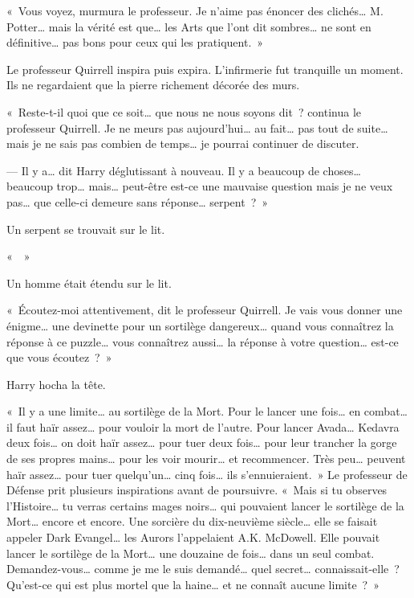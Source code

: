 {«~Vous voyez, murmura le professeur.
Je n'aime pas énoncer des clichés…
M. Potter… mais la vérité est que… les Arts que l'ont dit sombres… ne sont en définitive… pas bons pour ceux qui les pratiquent.~»

Le professeur Quirrell inspira puis expira.
L'infirmerie fut tranquille un moment.
Ils ne regardaient que la pierre richement décorée des murs.

«~Reste-t-il quoi que ce soit… que nous ne nous soyons dit~? continua le professeur Quirrell.
Je ne meurs pas aujourd'hui… au fait… pas tout de suite… mais je ne sais pas combien de temps… je pourrai continuer de discuter.

--- Il y a… dit Harry déglutissant à nouveau.
Il y a beaucoup de choses… beaucoup trop… mais… peut-être est-ce une mauvaise question mais je ne veux pas… que celle-ci demeure sans réponse… serpent~?~»

Un serpent se trouvait sur le lit.

«~~»

Un homme était étendu sur le lit.

«~Écoutez-moi attentivement, dit le professeur Quirrell.
Je vais vous donner une énigme… une devinette pour un sortilège dangereux… quand vous connaîtrez la réponse à ce puzzle… vous connaîtrez aussi… la réponse à votre question… est-ce que vous écoutez~?~»

Harry hocha la tête.

«~Il y a une limite… au sortilège de la Mort.
Pour le lancer une fois… en combat… il faut haïr assez… pour vouloir la mort de l'autre.
Pour lancer Avada…
Kedavra deux fois… on doit haïr assez… pour tuer deux fois… pour leur trancher la gorge de ses propres mains… pour les voir mourir… et recommencer.
Très peu… peuvent haïr assez… pour tuer quelqu'un… cinq fois… ils s'ennuieraient.~»
Le professeur de Défense prit plusieurs inspirations avant de poursuivre.
«~Mais si tu observes l'Histoire… tu verras certains mages noirs… qui pouvaient lancer le sortilège de la Mort… encore et encore.
Une sorcière du dix-neuvième siècle… elle se faisait appeler Dark Evangel… les Aurors l'appelaient A.K.
McDowell.
Elle pouvait lancer le sortilège de la Mort… une douzaine de fois… dans un seul combat.
Demandez-vous… comme je me le suis demandé… quel secret… connaissait-elle~?
Qu'est-ce qui est plus mortel que la haine… et ne connaît aucune limite~?~»

}
